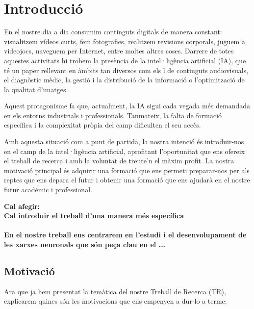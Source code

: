 \chapter{Introducció}
\label{c:intro}
En el nostre dia a dia consumim continguts digitals de manera constant: visualitzem vídeos curts, fem fotografies, realitzem revisions corporals, juguem a videojocs, naveguem per Internet, entre moltes altres coses. Darrere de totes aquestes activitats hi trobem la presència de la intel·ligència artificial (IA), que té un paper rellevant en àmbits tan diversos com els l de continguts audiovisuals, el diagnòstic mèdic, la gestió i la distribució de la informació o l’optimització de la qualitat d’imatges.

Aquest protagonisme fa que, actualment, la IA sigui cada vegada més demandada en els entorns industrials i professionals. Tanmateix, la falta de formació específica i la complexitat pròpia del camp dificulten el seu accès.

Amb aquesta situació com a punt de partida, la nostra intenció és introduir-nos en el camp de la intel·ligència artificial, aprofitant l’oportunitat que ens ofereix el treball de recerca i amb la voluntat de treure’n el màxim profit. La nostra motivació principal és adquirir una formació que ens permeti preparar-nos per als reptes que ens depara el futur i obtenir una formació que ens ajudarà en el nostre futur acadèmic i professional.


\bigskip

\textbf{Cal afegir:\\ Cal introduir el treball d'una manera més específica\\\\
En el nostre treball ens centrarem en l'estudi i el desenvolupament de les xarxes neuronals que són peça clau en el ...}



\section{Motivació}
Ara que ja hem presentat la temàtica del nostre Treball de Recerca (TR), explicarem quines són les motivacions que ens empenyen a dur-lo a terme:

